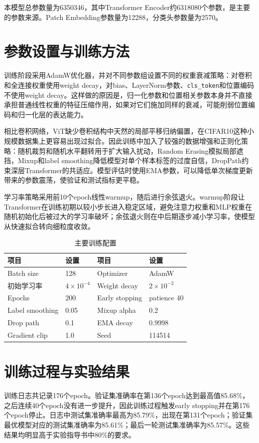 \documentclass[11pt]{article}
\begin{document}
	本模型总参数量为6350346，其中Transformer Encoder约6318080个参数，是主要的参数来源。Patch Embedding参数量为12288，分类头参数量为2570。

	\section{参数设置与训练方法}
	训练阶段采用AdamW优化器，并对不同参数组设置不同的权重衰减策略：对卷积和全连接权重使用weight decay，对bias、LayerNorm参数、\texttt{cls\_token}和位置编码不使用weight decay。这样做的原因是，归一化参数和位置相关参数本身并不直接承担普通线性权重的特征压缩作用，如果对它们施加同样的衰减，可能削弱位置编码和归一化层的表达能力。

	相比卷积网络，ViT缺少卷积结构中天然的局部平移归纳偏置，在CIFAR10这种小规模数据集上更容易出现过拟合。因此训练中加入了较强的数据增强和正则化策略：随机裁剪和随机水平翻转用于扩大输入扰动，Random Erasing模拟局部遮挡，Mixup和label smoothing降低模型对单个样本标签的过度自信，DropPath约束深层Transformer的共适应。模型评估时使用EMA参数，可以降低单次梯度更新带来的参数震荡，使验证和测试指标更平稳。

	学习率策略采用前10个epoch线性warmup，随后进行余弦退火。warmup阶段让Transformer在训练初期以较小步长进入稳定区域，避免注意力权重和MLP权重在随机初始化后被过大的学习率破坏；余弦退火则在中后期逐步减小学习率，使模型从快速拟合转向细粒度收敛。

	\begin{table}[H]
		\centering
		\caption{主要训练配置}
		\small
		\begin{tabular}{M{3cm} M{3cm} M{3cm} M{3cm}}
			\toprule
			项目 & 设置 & 项目 & 设置 \\
			\midrule
			Batch size & 128 & Optimizer & AdamW \\
			初始学习率 & $4\times10^{-4}$ & Weight decay & $2\times10^{-2}$ \\
			Epochs & 200 & Early stopping & patience 40 \\
			Label smoothing & 0.05 & Mixup alpha & 0.2 \\
			Drop path & 0.1 & EMA decay & 0.9998 \\
			Gradient clip & 1.0 & Seed & 114514 \\
			\bottomrule
		\end{tabular}
	\end{table}

	\section{训练过程与实验结果}
	训练日志共记录176个epoch。验证集准确率在第136个epoch达到最高值85.68\%，之后连续40个epoch没有进一步提升，因此训练过程触发early stopping并在第176个epoch停止。日志中测试集准确率最高为85.79\%，出现在第131个epoch；验证集最优模型对应的测试集准确率为85.61\%；最后一轮测试集准确率为85.57\%。这些结果均明显高于实验指导书中80\%的要求。
\end{document}

